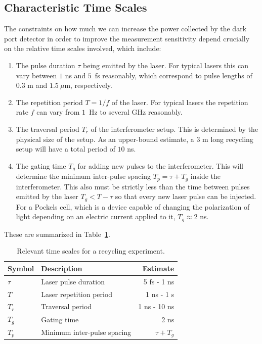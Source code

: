 \subsection{Characteristic Time Scales}
The constraints on how much we can increase the power collected by the dark port detector in order to improve the measurement sensitivity depend crucially on the relative time scales involved, which include:
\begin{enumerate}
  \item The pulse duration $\tau$ being emitted by the laser.  For typical lasers this can vary between $1$ ns and $5$~fs reasonably, which correspond to pulse lengths of $0.3$ m and $1.5~\mu$m, respectively.
  \item The repetition period $T = 1/f$ of the laser.  For typical lasers the repetition rate $f$ can vary from $1$~Hz to several GHz reasonably.
  \item The traversal period $T_r$ of the interferometer setup.  This is determined by the physical size of the setup.  As an upper-bound estimate, a $3$ m long recycling setup will have a total period of $10$ ns.
  \item The gating time $T_g$ for adding new pulses to the interferometer.  This will determine the minimum inter-pulse spacing $T_p = \tau + T_g$ inside the interferometer.  This also must be strictly less than the time between pulses emitted by the laser $T_g < T - \tau$ so that every new laser pulse can be injected.  For a Pockels cell, which is a device capable of changing the polarization of light depending on an electric current applied to it, $T_g \approx 2$ ns.
\end{enumerate}
These are summarized in Table~\ref{tab:timescales}.

\begin{table}
  \centering
  \begin{tabular}{l | l r}
    Symbol \; & \; Description & Estimate \\
    \hline
    $\tau$ & \; Laser pulse duration & 5 fs - 1 ns \\
    $T$ & \; Laser repetition period & 1 ns - 1 s \\
    $T_r$ & \; Traversal period & 1 ns - 10 ns \\
    $T_g$ & \; Gating time & 2 ns \\
    $T_p$ & \; Minimum inter-pulse spacing & $\tau + T_g$
  \end{tabular}
  \caption{Relevant time scales for a recycling experiment.}
  \label{tab:timescales}
\end{table}

